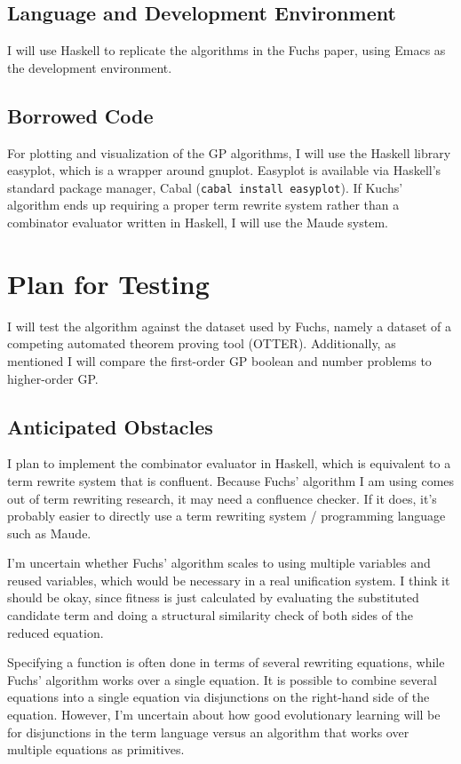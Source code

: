 \documentclass{article}
\begin{document}
\subsection{Language and Development Environment}

I will use Haskell to replicate the algorithms in the Fuchs paper,
using Emacs as the development environment. 

\subsection{Borrowed Code}

For plotting and visualization of the GP algorithms, I will use the
Haskell library easyplot, which is a wrapper around gnuplot. Easyplot
is available via Haskell's standard package manager, Cabal
(\texttt{cabal install easyplot}).
If Kuchs' algorithm ends up requiring a proper term rewrite system
rather than a combinator evaluator written in Haskell, I will use the
Maude system.

\section{Plan for Testing}

I will test the algorithm against the dataset used by Fuchs, namely a
dataset of a competing automated theorem proving tool (OTTER).
Additionally, as mentioned I will compare the first-order GP boolean
and number problems to higher-order GP.

\subsection{Anticipated Obstacles}

I plan to implement the combinator evaluator in Haskell, which is
equivalent to a term rewrite system that is confluent. Because Fuchs'
algorithm I am using comes out of term rewriting research, it may need
a confluence checker. If it does, it's probably easier to directly use
a term rewriting system / programming language such as Maude.

I'm uncertain whether Fuchs' algorithm scales to using
multiple variables and reused variables, which would be necessary in a
real unification system. I think it should be okay, since fitness is
just calculated by evaluating the substituted candidate term and doing
a structural similarity check of both sides of the reduced equation.

Specifying a function is often done in terms of several rewriting
equations, while Fuchs' algorithm works over a single equation. It is
possible to combine several equations into a single equation via
disjunctions on the right-hand side of the equation. However, I'm
uncertain about how good evolutionary learning will be for disjunctions
in the term language versus an algorithm that works over multiple
equations as primitives.
\end{document}
